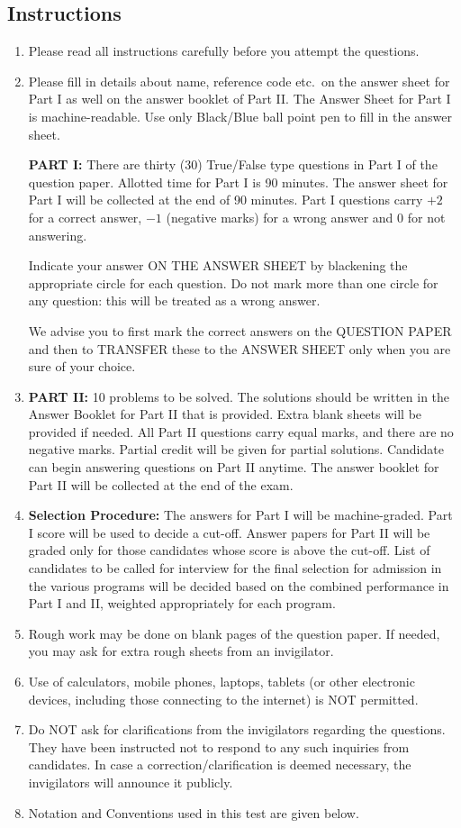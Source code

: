 \documentclass[11pt, a4paper]{article}
\begin{document}
\subsection*{Instructions}
\begin{enumerate}
  \item Please read all instructions carefully before you attempt the questions.
  \item Please fill in details about name, reference code etc.\ on the answer sheet for Part I as well on the answer booklet of Part II. The Answer Sheet for Part I is machine-readable. Use only Black/Blue ball point pen to fill in the answer sheet.

  \textbf{PART I:} There are thirty (30) True/False type questions in Part I of the question paper. Allotted time for Part I is 90 minutes. The answer sheet for Part I will be collected at the end of 90 minutes. Part I questions carry $+2$ for a correct answer, $-1$ (negative marks) for a wrong answer and $0$ for not answering.

  Indicate your answer ON THE ANSWER SHEET by blackening the appropriate circle for each question. Do not mark more than one circle for any question: this will be treated as a wrong answer.

  We advise you to first mark the correct answers on the QUESTION PAPER and then to TRANSFER these to the ANSWER SHEET only when you are sure of your choice.
  \item \textbf{PART II:} 10 problems to be solved. The solutions should be written in the Answer Booklet for Part II that is provided. Extra blank sheets will be provided if needed. All Part II questions carry equal marks, and there are no negative marks. Partial credit will be given for partial solutions. Candidate can begin answering questions on Part II anytime. The answer booklet for Part II will be collected at the end of the exam.
  \item \textbf{Selection Procedure:} The answers for Part I will be machine-graded. Part I score will be used to decide a cut-off. Answer papers for Part II will be graded only for those candidates whose score is above the cut-off. List of candidates to be called for interview for the final selection for admission in the various programs will be decided based on the combined performance in Part I and II, weighted appropriately for each program.
  \item Rough work may be done on blank pages of the question paper. If needed, you may ask for extra rough sheets from an invigilator.
  \item Use of calculators, mobile phones, laptops, tablets (or other electronic devices, including those connecting to the internet) is NOT permitted.
  \item Do NOT ask for clarifications from the invigilators regarding the questions. They have been instructed not to respond to any such inquiries from candidates. In case a correction/clarification is deemed necessary, the invigilators will announce it publicly.
  \item Notation and Conventions used in this test are given below.
\end{enumerate}
\end{document}
